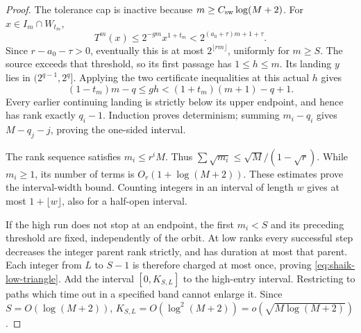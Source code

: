 \documentclass[11pt]{article}
\theoremstyle{remark}\newtheorem{remark}[proposition]{Remark}
\begin{document}
\begin{proof}
The tolerance cap is inactive because \(m\ge C_{\rm sw}\log(M+2)\).
For \(x\in I_m\cap W_{t_m}\),
\[
 T^m(x)\le2^{-gm}x^{1+t_m}
 <2^{(a_0+\tau)m+1+\tau}.
\]
Since \(r-a_0-\tau>0\), eventually this is at most
\(2^{\lfloor rm\rfloor}\), uniformly for \(m\ge S\).
The source exceeds that threshold, so its first passage has
\(1\le h\le m\). Its landing \(y\) lies in \((2^{q-1},2^q]\).
Applying the two certificate inequalities at this actual \(h\) gives
\[
 (1-t_m)m-q\le gh<(1+t_m)(m+1)-q+1 .
\]
Every earlier continuing landing is strictly below its upper endpoint,
and hence has rank exactly \(q_i-1\). Induction proves determinism;
summing \(m_i-q_i\) gives \(M-q_j-j\), proving the one-sided interval.

The rank sequence satisfies \(m_i\le r^iM\). Thus
\(\sum\sqrt{m_i}\le\sqrt M/(1-\sqrt r)\).
While \(m_i\ge1\), its number of terms is
\(O_r(1+\log(M+2))\). These estimates prove the interval-width bound.
Counting integers in an interval of length \(w\) gives at most
\(1+\lfloor w\rfloor\), also for a half-open interval.

If the high run does not stop at an endpoint, the first \(m_i<S\)
and its preceding threshold are fixed, independently of the orbit.
At low ranks every successful step decreases the integer parent rank
strictly, and has duration at most that parent. Each integer from
\(L\) to \(S-1\) is therefore charged at most once, proving
\eqref{eq:shaik-low-triangle}. Add the interval \([0,K_{S,L}]\)
to the high-entry interval. Restricting to paths which time out in
a specified band cannot enlarge it. Since \(S=O(\log(M+2))\),
\(K_{S,L}=O(\log^2(M+2))=o(\sqrt{M\log(M+2)})\).
\end{proof}
\end{document}
